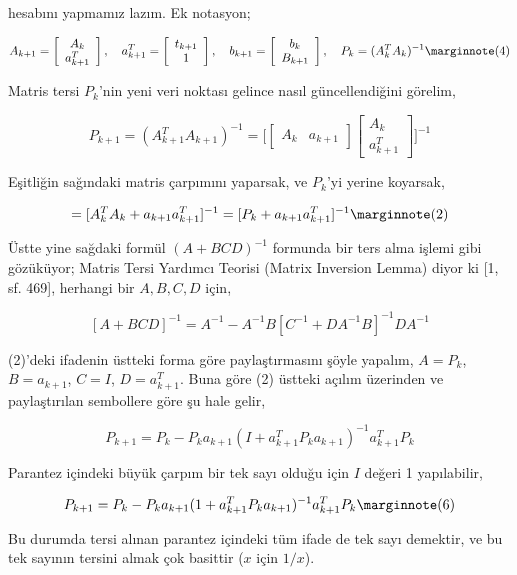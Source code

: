 \documentclass[12pt,fleqn]{article}\usepackage{../../common}
\begin{document}
hesabını yapmamız lazım. Ek notasyon;

$$ 
A_{k+1} = \left[\begin{array}{c}
A_k \\ a_{k+1}^T
\end{array}\right], \quad
a_{k+1}^T = \left[\begin{array}{c}
t_{k+1} \\ 1
\end{array}\right], \quad 
b_{k+1} = \left[\begin{array}{c}
b_k \\ B_{k+1}
\end{array}\right], \quad 
P_k = (A_k^TA_k)^{-1}
\mlabel{4}
 $$

Matris tersi $P_k$'nin yeni veri noktası gelince nasıl güncellendiğini
görelim, 

$$ 
P_{k+1} = (A_{k+1}^TA_{k+1})^{-1} = 
\bigg[
\left[\begin{array}{cc}A_k & a_{k+1} \end{array}\right]
\left[\begin{array}{c}A_k \\ a_{k+1}^T \end{array}\right]
\bigg]^{-1}
$$

Eşitliğin sağındaki matris çarpımını yaparsak, ve $P_k$'yi yerine koyarsak,

$$ = [ A_k^TA_k + a_{k+1}a_{k+1}^T ]^{-1} 
= [ P_k + a_{k+1}a_{k+1}^T ]^{-1} 
\mlabel{2}
$$

Üstte yine sağdaki formül $(A+BCD)^{-1}$ formunda bir ters alma işlemi gibi
gözüküyor; Matris Tersi Yardımcı Teorisi (Matrix Inversion Lemma) diyor ki
[1, sf. 469], herhangi bir $A,B,C,D$ için,

$$ [A + BCD]^{-1} = A^{-1} - A^{-1}B[C^{-1} + DA^{-1} B]^{-1} DA^{-1} $$

(2)'deki ifadenin üstteki forma göre paylaştırmasını şöyle yapalım, 
$A = P_k$, $B = a_{k+1}$, $C=I$, $D=a_{k+1}^T$. Buna göre (2) üstteki 
açılım üzerinden ve paylaştırılan sembollere göre şu hale gelir,

$$ P_{k+1} = P_k - P_k a_{k+1}(I + a_{k+1}^T P_k a_{k+1})^{-1} a_{k+1}^TP_k  $$

Parantez içindeki büyük çarpım bir tek sayı olduğu için $I$ değeri 1
yapılabilir,

$$ P_{k+1} = P_k - P_k a_{k+1}(1 + a_{k+1}^T P_k a_{k+1})^{-1} a_{k+1}^TP_k  
\mlabel{6}
$$

Bu durumda tersi alınan parantez içindeki tüm ifade de tek sayı demektir,
ve bu tek sayının tersini almak çok basittir ($x$ için $1/x$). 
\end{document}
